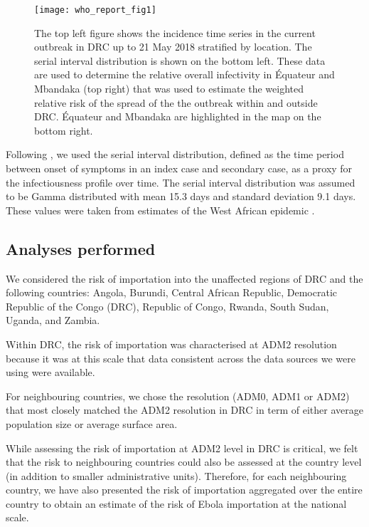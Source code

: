 \documentclass[11pt,]{article}
\begin{document}
\begin{figure}
  \centering
  \texttt{[image: who\_report\_fig1]}
  \caption{The top left figure shows the incidence time series in the
    current outbreak in DRC up to
    21 May 2018 stratified by location. The serial interval distribution is shown on the
    bottom left. These data are used to determine the relative overall
    infectivity in Équateur and Mbandaka (top right) that was used to
    estimate the weighted relative risk  of the spread of the 
    the outbreak within and outside DRC. Équateur and Mbandaka are
    highlighted in the map on the bottom right.}
  \label{fig:infprofile}  
\end{figure}

Following \citep{cori2013new}, we used the serial interval
distribution, defined as the time period between onset of symptoms in
an index case
and secondary case, as a proxy for the infectiousness profile over time.
The serial interval distribution was assumed to be Gamma distributed
with mean 15.3 days and standard deviation 9.1 days.
These values were taken from estimates of the West African epidemic \citep{who2014ebola}.

\subsection*{Analyses performed}

We considered the risk of importation into the unaffected regions of
DRC and the following countries: Angola, Burundi,
Central African Republic, Democratic Republic of the Congo (DRC), 
Republic of Congo, Rwanda, South Sudan,
Uganda, and Zambia. 

Within DRC, the risk of importation was characterised at ADM2
resolution because it was at this scale that data consistent across
the data sources we were using were available.

For neighbouring countries, we chose the resolution
(ADM0, ADM1 or ADM2) that most closely matched the ADM2 resolution in
DRC in term of either average population size or average surface area.

While assessing the risk of importation at ADM2 level in DRC is
critical, we felt that the risk to neighbouring countries
could also be assessed at the country level (in addition to smaller administrative units).
Therefore, for each neighbouring country, we have also presented the risk of
importation aggregated
over the entire country to obtain an estimate of the risk of Ebola importation at the national scale.
\end{document}
